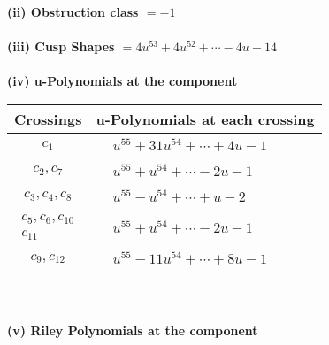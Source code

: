 \documentclass[1p]{elsarticle_modified}
\theoremstyle{definition}
\begin{document}
\flushleft \textbf{(ii) Obstruction class $= -1$}\\~\\
\flushleft \textbf{(iii) Cusp Shapes $= 4 u^{53}+4 u^{52}+\cdots-4 u-14$}\\~\\
\newpage\renewcommand{\arraystretch}{1}
\flushleft \textbf{(iv) u-Polynomials at the component}\newline \\
\begin{tabular}{m{50pt}|m{274pt}}
Crossings & \hspace{64pt}u-Polynomials at each crossing \\
\hline $$\begin{aligned}c_{1}\end{aligned}$$&$\begin{aligned}
&u^{55}+31 u^{54}+\cdots+4 u-1
\end{aligned}$\\
\hline $$\begin{aligned}c_{2},c_{7}\end{aligned}$$&$\begin{aligned}
&u^{55}+u^{54}+\cdots-2 u-1
\end{aligned}$\\
\hline $$\begin{aligned}c_{3},c_{4},c_{8}\end{aligned}$$&$\begin{aligned}
&u^{55}- u^{54}+\cdots+u-2
\end{aligned}$\\
\hline $$\begin{aligned}c_{5},c_{6},c_{10}\\c_{11}\end{aligned}$$&$\begin{aligned}
&u^{55}+u^{54}+\cdots-2 u-1
\end{aligned}$\\
\hline $$\begin{aligned}c_{9},c_{12}\end{aligned}$$&$\begin{aligned}
&u^{55}-11 u^{54}+\cdots+8 u-1
\end{aligned}$\\
\hline
\end{tabular}\\~\\
\newpage\renewcommand{\arraystretch}{1}
\flushleft \textbf{(v) Riley Polynomials at the component}\newline \\
\end{document}
